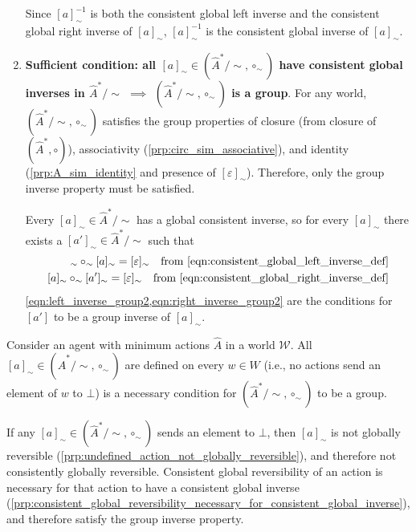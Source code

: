 \begin{proofE}
\begin{enumerate}
    Since $[a]^{-1}_{\sim}$ is both the consistent global left inverse and the consistent global right inverse of $[a]_{\sim}$, $[a]^{-1}_{\sim}$ is the consistent global inverse of $[a]_{\sim}$.


    \item \textbf{Sufficient condition: all $[a]_{\sim} \in (\hat{A}^{*}/\sim, \circ_{\sim})$ have consistent global inverses in $\hat{A}^{*}/\sim$ $\implies$ $(\hat{A}^{*}/\sim, \circ_{\sim})$ is a group}.
    For any world, $(\hat{A}^{*}/\sim, \circ_{\sim})$ satisfies the group properties of closure (from closure of $(\hat{A}^{*}, \circ)$), associativity (\cref{prp:circ_sim_associative}), and identity (\cref{prp:A_sim_identity} and presence of $[\varepsilon]_{\sim}$).
    Therefore, only the group inverse property must be satisfied.
    
    Every $[a]_{\sim} \in \hat{A}^{*}/\sim$ has a global consistent inverse, so for every $[a]_{\sim}$ there exists a $[a']_{\sim} \in \hat{A}^{*}/\sim$ such that
    \begin{align}
        [a']_{\sim} \circ_{\sim} [a]_{\sim} = [\varepsilon]_{\sim} \quad \text{from \cref{eqn:consistent_global_left_inverse_def}}
        \label{eqn:left_inverse_group2} \\
        [a]_{\sim} \circ_{\sim} [a']_{\sim} = [\varepsilon]_{\sim} \quad \text{from \cref{eqn:consistent_global_right_inverse_def}}
        \label{eqn:right_inverse_group2}
    \end{align}
    \cref{eqn:left_inverse_group2,eqn:right_inverse_group2} are the conditions for $[a']$ to be a group inverse of $[a]_{\sim}$.
\end{enumerate}
\end{proofE}




\begin{propositionE}
    Consider an agent with minimum actions $\hat{A}$ in a world $\mathscr{W}$.
    All $[a]_{\sim} \in (\hat{A}^{*}/\sim, \circ_{\sim})$ are defined on every $w \in W$ (i.e., no actions send an element of $w$ to $\bot$) is a necessary condition for $(\hat{A}^{*}/\sim, \circ_{\sim})$ to be a group.
\end{propositionE}
\begin{proofE}
    If any $[a]_{\sim} \in (\hat{A}^{*}/\sim, \circ_{\sim})$ sends an element to $\bot$, then $[a]_{\sim}$ is not globally reversible (\cref{prp:undefined_action_not_globally_reversible}), and therefore not consistently globally reversible.
    Consistent global reversibility of an action is necessary for that action to have a consistent global inverse (\cref{prp:consistent_global_reversibility_necessary_for_consistent_global_inverse}), and therefore satisfy the group inverse property.
\end{proofE}

